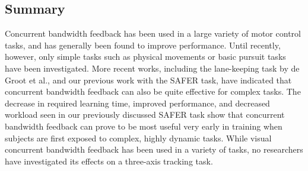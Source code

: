 
\subsection{Summary}
Concurrent bandwidth feedback has been used in a large variety of motor control tasks, and has generally been found to improve performance.
Until recently, however, only simple tasks such as physical movements or basic pursuit tasks have been investigated.
More recent works, including the lane-keeping task by de Groot et al., and our previous work with the SAFER task, have indicated that concurrent bandwidth feedback can also be quite effective for complex tasks.
The decrease in required learning time, improved performance, and decreased workload seen in our previously discussed SAFER task show that concurrent bandwidth feedback can prove to be most useful very early in training when subjects are first exposed to complex, highly dynamic tasks.
While visual concurrent bandwidth feedback has been used in a variety of tasks, no researchers have investigated its effects on a three-axis tracking task.

